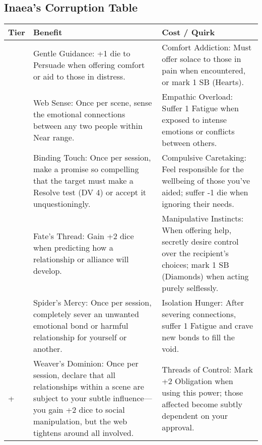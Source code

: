 \subsection*{Inaea's Corruption Table}
\label{sec:inaea-corruption}

\begin{longtable}{>{\raggedright\arraybackslash}p{1cm} p{5cm} p{5cm}}
\toprule
\textbf{Tier} & \textbf{Benefit} & \textbf{Cost / Quirk} \\
\midrule
1 & Gentle Guidance: +1 die to Persuade when offering comfort or aid to those in distress. & Comfort Addiction: Must offer solace to those in pain when encountered, or mark 1 SB (Hearts). \\
\midrule
2 & Web Sense: Once per scene, sense the emotional connections between any two people within Near range. & Empathic Overload: Suffer 1 Fatigue when exposed to intense emotions or conflicts between others. \\
\midrule
3 & Binding Touch: Once per session, make a promise so compelling that the target must make a Resolve test (DV 4) or accept it unquestioningly. & Compulsive Caretaking: Feel responsible for the wellbeing of those you've aided; suffer -1 die when ignoring their needs. \\
\midrule
4 & Fate's Thread: Gain +2 dice when predicting how a relationship or alliance will develop. & Manipulative Instincts: When offering help, secretly desire control over the recipient's choices; mark 1 SB (Diamonds) when acting purely selflessly. \\
\midrule
5 & Spider's Mercy: Once per session, completely sever an unwanted emotional bond or harmful relationship for yourself or another. & Isolation Hunger: After severing connections, suffer 1 Fatigue and crave new bonds to fill the void. \\
\midrule
6+ & Weaver's Dominion: Once per session, declare that all relationships within a scene are subject to your subtle influence—you gain +2 dice to social manipulation, but the web tightens around all involved. & Threads of Control: Mark +2 Obligation when using this power; those affected become subtly dependent on your approval. \\
\bottomrule
\end{longtable}